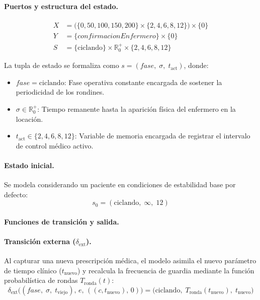 \documentclass{article}
\newcommand{\dext}{\delta_{\mathrm{ext}}}
\begin{document}
\paragraph{Puertos y estructura del estado.}
\begin{align*}
  X &= \bigl( \{0, 50, 100, 150, 200\} \times \{2, 4, 6, 8, 12\} \bigr) \times \{0\} \\[4pt]
  Y &= \{\mathit{confirmacionEnfermero}\} \times \{0\} \\[4pt]
  S &= \{\text{ciclando}\} \times \mathbb{R}_0^+ \times \{2, 4, 6, 8, 12\}
\end{align*}

La tupla de estado se formaliza como $s = (\mathit{fase},\; \sigma,\; t_{\mathrm{act}})$, donde:
\begin{itemize}
  \item $\mathit{fase} = \text{ciclando}$: Fase operativa constante encargada de sostener la periodicidad de los rondines.
  \item $\sigma \in \mathbb{R}_0^+$: Tiempo remanente hasta la aparición física del enfermero en la locación.
  \item $t_{\mathrm{act}} \in \{2, 4, 6, 8, 12\}$: Variable de memoria encargada de registrar el intervalo de control médico activo.
\end{itemize}

\paragraph{Estado inicial.}
Se modela considerando un paciente en condiciones de estabilidad base por defecto:
\[
  s_0 = (\text{ciclando},\; \infty,\; 12)
\]

\paragraph{Funciones de transición y salida.}

\paragraph{Transición externa ($\dext$).}
Al capturar una nueva prescripción médica, el modelo asimila el nuevo parámetro de tiempo clínico ($t_{\mathrm{nuevo}}$) y recalcula la frecuencia de guardia mediante la función probabilística de rondas $T_{\mathrm{ronda}}(t)$:
\[
  \dext\bigl((\mathit{fase},\; \sigma,\; t_{\mathrm{viejo}}),\, e,\, ((c, t_{\mathrm{nuevo}}),\, 0)\bigr) = \bigl(\text{ciclando},\; T_{\mathrm{ronda}}(t_{\mathrm{nuevo}}),\; t_{\mathrm{nuevo}}\bigr)
\]
\end{document}

